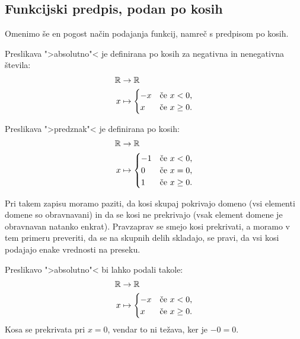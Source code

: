 \subsection{Funkcijski predpis, podan po kosih}

Omenimo še en pogost način podajanja funkcij, namreč s predpisom po kosih.

\begin{primer}
  Preslikava ">absolutno"< je definirana po kosih za negativna in nenegativna števila:
  \begin{align*}
    \mathbb{R} &\to \mathbb{R} \\
    x &\mapsto
    \begin{cases}
      -x & \text{če $x < 0$,}\\
       x & \text{če $x \geq 0$.}
    \end{cases}
  \end{align*}
\end{primer}

\begin{primer}
  Preslikava ">predznak"< je definirana po kosih:
  \begin{align*}
    \mathbb{R} &\to \mathbb{R} \\
    x &\mapsto
      \begin{cases}
        -1 & \text{če $x < 0$,}\\
        0 & \text{če $x = 0$,}\\
        1 & \text{če $x \geq 0$.}
      \end{cases}
  \end{align*}
\end{primer}


Pri takem zapisu moramo paziti, da kosi skupaj pokrivajo domeno (vsi elementi domene so obravnavani) in da se kosi ne prekrivajo (vsak element domene je obravnavan natanko enkrat). Pravzaprav se smejo kosi prekrivati, a moramo v tem primeru preveriti, da se na skupnih delih skladajo, se pravi, da vsi kosi podajajo enake vrednosti na preseku.

\begin{primer}
  Preslikavo ">absolutno"< bi lahko podali takole:
  \begin{align*}
    \mathbb{R} &\to \mathbb{R} \\
    x &\mapsto
    \begin{cases}
      -x & \text{če $x < 0$,}\\
       x & \text{če $x \geq 0$.}
    \end{cases}
  \end{align*}
  Kosa se prekrivata pri $x = 0$, vendar to ni težava, ker je $-0 = 0$.
\end{primer}


